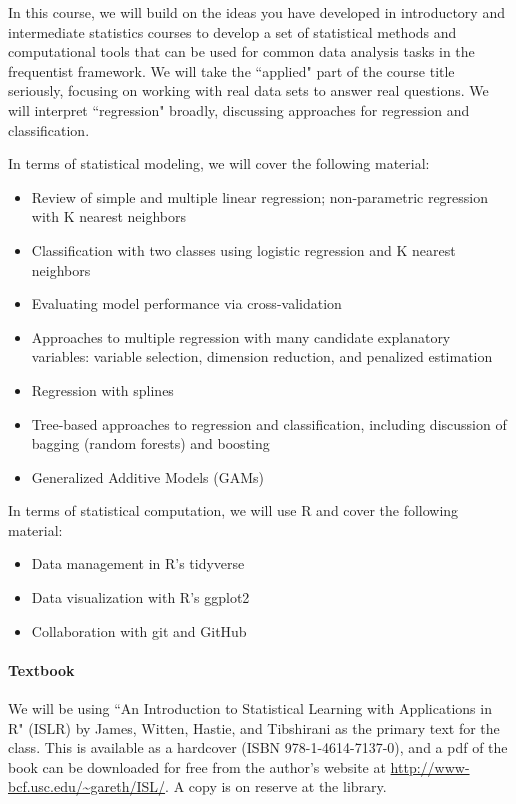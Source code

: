 \documentclass[11pt]{article}
\begin{document}
In this course, we will build on the ideas you have developed in introductory and intermediate statistics courses to develop a set of statistical methods and computational tools that can be used for common data analysis tasks in the frequentist framework.  We will take the ``applied" part of the course title seriously, focusing on working with real data sets to answer real questions.  We will interpret ``regression" broadly, discussing approaches for regression and classification.

In terms of statistical modeling, we will cover the following material:
\begin{itemize}
  \item Review of simple and multiple linear regression; non-parametric regression with K nearest neighbors
  \item Classification with two classes using logistic regression and K nearest neighbors
  \item Evaluating model performance via cross-validation
  \item Approaches to multiple regression with many candidate explanatory variables: variable selection, dimension reduction, and penalized estimation
  \item Regression with splines
  \item Tree-based approaches to regression and classification, including discussion of bagging (random forests) and boosting
  \item Generalized Additive Models (GAMs)
\end{itemize}

In terms of statistical computation, we will use R and cover the following material:
\begin{itemize}
  \item Data management in R's tidyverse
  \item Data visualization with R's ggplot2
  \item Collaboration with git and GitHub
\end{itemize}

\paragraph{Textbook}

We will be using ``An Introduction to Statistical Learning with Applications in R" (ISLR) by James, Witten, Hastie, and Tibshirani as the primary text for the class.  This is available as a hardcover (ISBN 978-1-4614-7137-0), and a pdf of the book can be downloaded for free from the author's website at \url{http://www-bcf.usc.edu/~gareth/ISL/}.
A copy is on reserve at the library.
\end{document}
